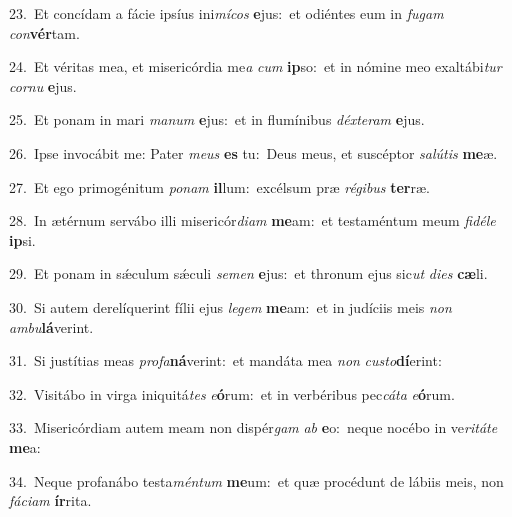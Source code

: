 {\numbfont\textcolor{\numbcolor}{23.}}~Et concídam a fácie ipsíus ini\-\textit{mí}\-\textit{cos} \textbf{e}\-jus:~\star et odiéntes eum in \textit{fu}\-\textit{gam} \textit{con}\-\textbf{vér}tam.\par
{\numbfont\textcolor{\numbcolor}{24.}}~Et véritas mea, et misericórdia me\textit{a} \textit{cum} \textbf{ip}\-so:~\star et in nómine meo exaltábi\textit{tur} \textit{cor}\-\textit{nu} \textbf{e}\-jus.\par
{\numbfont\textcolor{\numbcolor}{25.}}~Et ponam in mari \textit{ma}\-\textit{num} \textbf{e}\-jus:~\star et in flumínibus \textit{déx}\-\textit{te}\textit{ram} \textbf{e}\-jus.\par
{\numbfont\textcolor{\numbcolor}{26.}}~Ipse invocábit me: Pater \textit{me}\-\textit{us} \textbf{es} tu:~\star Deus meus, et suscéptor \textit{sa}\-\textit{lú}\textit{tis} \textbf{me}\-æ.\par
{\numbfont\textcolor{\numbcolor}{27.}}~Et ego primogénitum \textit{po}\-\textit{nam} \textbf{il}\-lum:~\star excélsum præ \textit{ré}\-\textit{gi}\textit{bus} \textbf{ter}\-ræ.\par
{\numbfont\textcolor{\numbcolor}{28.}}~In ætérnum servábo illi misericór\-\textit{di}\-\textit{am} \textbf{me}\-am:~\star et testaméntum meum \textit{fi}\-\textit{dé}\textit{le} \textbf{ip}\-si.\par
{\numbfont\textcolor{\numbcolor}{29.}}~Et ponam in sǽculum sǽculi \textit{se}\-\textit{men} \textbf{e}\-jus:~\star et thronum ejus sic\textit{ut} \textit{di}\-\textit{es} \textbf{cæ}\-li.\par
{\numbfont\textcolor{\numbcolor}{30.}}~Si autem derelíquerint fílii ejus \textit{le}\-\textit{gem} \textbf{me}\-am:~\star et in judíciis meis \textit{non} \textit{am}\-\textit{bu}\textbf{lá}verint.\par
{\numbfont\textcolor{\numbcolor}{31.}}~Si justítias meas \textit{pro}\-\textit{fa}\textbf{ná}verint:~\star et mandáta mea \textit{non} \textit{cus}\-\textit{to}\textbf{dí}erint:\par
{\numbfont\textcolor{\numbcolor}{32.}}~Visitábo in virga iniquitá\textit{tes} \textit{e}\-\textbf{ó}rum:~\star et in verbéribus pec\-\textit{cá}\-\textit{ta} \textit{e}\-\textbf{ó}rum.\par
{\numbfont\textcolor{\numbcolor}{33.}}~Misericórdiam autem meam non dispér\textit{gam} \textit{ab} \textbf{e}\-o:~\star neque nocébo in ve\-\textit{ri}\-\textit{tá}\textit{te} \textbf{me}\-a:\par
{\numbfont\textcolor{\numbcolor}{34.}}~Neque profanábo testa\-\textit{mén}\-\textit{tum} \textbf{me}\-um:~\star et quæ procédunt de lábiis meis, non \textit{fá}\-\textit{ci}\textit{am} \textbf{ír}\-rita.\par
